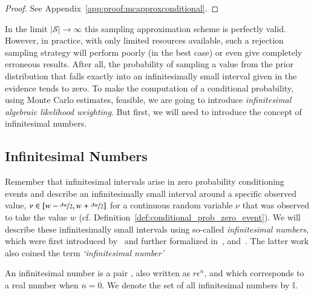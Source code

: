 \begin{proof}
    See Appendix~\ref{app:proof:mcapproxconditional}.
\end{proof}



In the limit $\lvert \mathcal{S} \rvert\rightarrow \infty$ this sampling approximation scheme is perfectly valid. However, in practice, with only limited resources available, such a rejection sampling strategy will perform poorly (in the best case) or even give completely erroneous results. After all, the probability of sampling a value from the prior distribution that falls exactly into an infinitesimally small interval given in the evidence tends to zero.
To make the computation of a conditional probability, using Monte Carlo estimates, feasible, we are going to introduce {\em infinitesimal algebraic likelihood weighting}. But first, we will need to introduce the concept of infinitesimal numbers.


\subsection{Infinitesimal Numbers}
Remember that infinitesimal intervals arise in zero probability conditioning events and describe an infinitesimally small interval around a specific observed value, \eg $\nu \in [w-\nicefrac{\Delta w}{2}, w+\nicefrac{\Delta w}{2} ]$ for a continuous random variable $\nu$ that was observed to take the value $w$ (cf. Definition~\ref{def:conditional_prob_zero_event}).
We will describe these infinitesimally small intervals using so-called {\em infinitesimal numbers}, which were first introduced by~\citet{nitti2016probabilistic} and further formalized in~\citet{wu2018discrete}, \citep{zuidberg2020atoms} and~\citep{jacobs2021paradoxes}. The latter work also coined the term {\em `infinitesimal number'} 

\begin{definition}
    \label{def:inf_number}
An infinitesimal number is a pair , also written as $r\epsilon^n$, and which corresponds to a real number when $n=0$. We denote the set of all infinitesimal numbers by $\mathbb{I}$.
\end{definition}


